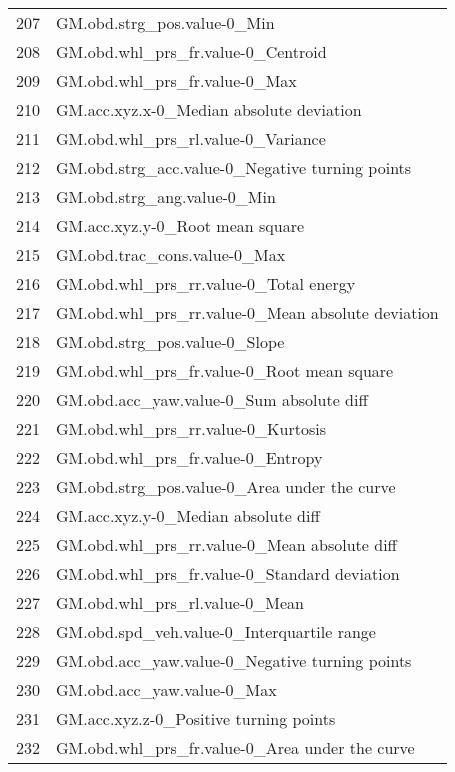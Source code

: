 \begin{tabular}{ll}
207 &                        GM.obd.strg\_pos.value-0\_Min \\
208 &                 GM.obd.whl\_prs\_fr.value-0\_Centroid \\
209 &                      GM.obd.whl\_prs\_fr.value-0\_Max \\
210 &           GM.acc.xyz.x-0\_Median absolute deviation \\
211 &                 GM.obd.whl\_prs\_rl.value-0\_Variance \\
212 &    GM.obd.strg\_acc.value-0\_Negative turning points \\
213 &                        GM.obd.strg\_ang.value-0\_Min \\
214 &                    GM.acc.xyz.y-0\_Root mean square \\
215 &                       GM.obd.trac\_cons.value-0\_Max \\
216 &             GM.obd.whl\_prs\_rr.value-0\_Total energy \\
217 &  GM.obd.whl\_prs\_rr.value-0\_Mean absolute deviation \\
218 &                      GM.obd.strg\_pos.value-0\_Slope \\
219 &         GM.obd.whl\_prs\_fr.value-0\_Root mean square \\
220 &           GM.obd.acc\_yaw.value-0\_Sum absolute diff \\
221 &                 GM.obd.whl\_prs\_rr.value-0\_Kurtosis \\
222 &                  GM.obd.whl\_prs\_fr.value-0\_Entropy \\
223 &       GM.obd.strg\_pos.value-0\_Area under the curve \\
224 &                GM.acc.xyz.y-0\_Median absolute diff \\
225 &       GM.obd.whl\_prs\_rr.value-0\_Mean absolute diff \\
226 &       GM.obd.whl\_prs\_fr.value-0\_Standard deviation \\
227 &                     GM.obd.whl\_prs\_rl.value-0\_Mean \\
228 &         GM.obd.spd\_veh.value-0\_Interquartile range \\
229 &     GM.obd.acc\_yaw.value-0\_Negative turning points \\
230 &                         GM.obd.acc\_yaw.value-0\_Max \\
231 &             GM.acc.xyz.z-0\_Positive turning points \\
232 &     GM.obd.whl\_prs\_fr.value-0\_Area under the curve \\

\end{tabular}
